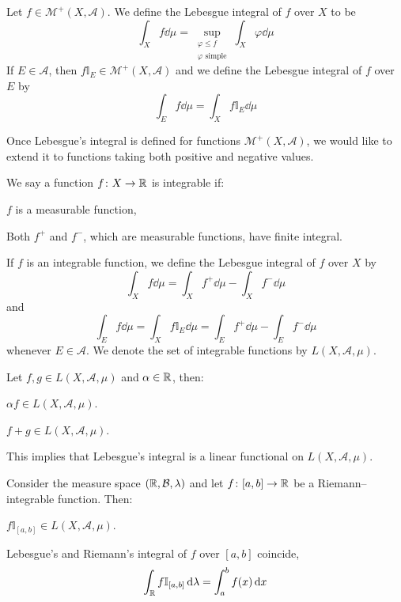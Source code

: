 \begin{definition*}
	Let $f \in \mathcal{M}^+(X, \mathcal{A})$. We define the Lebesgue integral
	of $f$ over $X$ to be
	\[
		\int_X f \dd{\mu} = 
		\sup_{\substack{\varphi \leq f \\ \varphi \text{ simple}}} \int_X \varphi \dd{\mu}	
	\]
	If $E \in \mathcal{A}$, then $f \mathbb{I}_E \in \mathcal{M}^+(X,
	\mathcal{A})$ and we define the Lebesgue integral of $f$ over $E$ by
	\[
		\int_E f \dd{\mu} = \int_X f \mathbb{I}_E \dd{\mu}
	\] 
\end{definition*}

Once Lebesgue's integral is defined for functions $\mathcal{M}^+(X,
\mathcal{A})$, we would like to extend it to functions taking both positive and
negative values.

\begin{definition*}
	We say a function $f \colon X \rightarrow \mathbb{R}$ is integrable if:
	\begin{enumeratedef}
		\item $f$ is a measurable function,
		\item Both $f^+$ and $f^-$, which are measurable functions, have finite integral.
	\end{enumeratedef}
	If $f$ is an integrable function, we define the Lebesgue integral of $f$ over $X$ by
	\[
		\int_X f \dd{\mu} = \int_X f^+ \dd{\mu} - \int_X f^- \dd{\mu}	
	\]
	and
	\[
		\int_E f \dd{\mu} = \int_X f \mathbb{I}_E \dd{\mu} = \int_E f^+ \dd{\mu} - \int_E f^- \dd{\mu}	
	\]
	whenever $E \in \mathcal{A}$. We denote the set of integrable functions by $L(X, \mathcal{A}, \mu)$.
\end{definition*}

\begin{theorem}
	Let $f, g \in L(X, \mathcal{A}, \mu)$ and $\alpha \in \mathbb{R}$, then:
	\begin{enumerateprop}
		\item $\alpha f \in L(X, \mathcal{A}, \mu)$.
		\item $f + g \in L(X, \mathcal{A}, \mu)$.
	\end{enumerateprop}
	This implies that Lebesgue's integral is a linear functional on $L(X, \mathcal{A}, \mu)$.
\end{theorem}

\begin{theorem}
	Consider the measure space $(\mathbb{R}, \mathcal{B}, \lambda)$ and let $f \colon
	[a, b] \rightarrow \mathbb{R}$ be a Riemann--integrable function. Then:
	\begin{enumerateprop}
		\item $f \mathbb{I}_{[a,b]} \in L(X, \mathcal{A}, \mu)$.
		\item Lebesgue's and Riemann's integral of $f$ over $[a,b]$ coincide, \ie
		\[
			\int_{\mathbb{R}} f \mathbb{I}_{[a,b]} \dd{\lambda} = \int_a^b f(x) \dd{x}	
		\]
	\end{enumerateprop}
\end{theorem}

